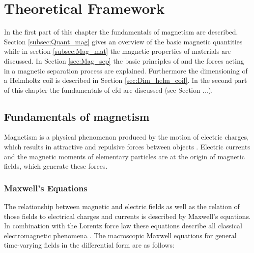 


\section{}




\chapter{Theoretical Framework}
\label{chap:chap_theo}


In the first part of this chapter the fundamentals of magnetism are described. Section \ref{subsec:Quant_mag} gives an overview of the basic magnetic quantities while in section \ref{subsec:Mag_mat} the magnetic properties of materials are discussed. In Section \ref{sec:Mag_sep} the basic principles of and the forces acting in a magnetic separation process are explained. Furthermore the dimensioning of a Helmholtz coil is described in Section \ref{sec:Dim_helm_coil}.
In the second part of this chapter the fundamentals of \gls{cfd} are discussed (see Section ...). 

\section{Fundamentals of magnetism}
\label{sec:Fund_mag}
Magnetism is a physical phenomenon produced by the motion of electric charges, which results in attractive and repulsive forces between objects \cite{stevenson2010oxford}. Electric currents and the magnetic moments of elementary particles are at the origin of magnetic fields, which generate these forces. 

\subsection{Maxwell's Equations}
\label{subsec:Maxwell}
The relationship between magnetic and electric fields as well as the relation of those fields to electrical charges and currents is described by  Maxwell’s equations. In combination with the Lorentz force law these equations describe all classical electromagnetic phenomena \cite{SWB-427138094} . The macroscopic Maxwell equations for general time-varying fields in the differential form are as follows: 

